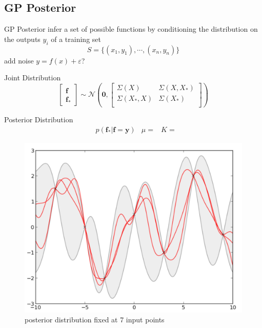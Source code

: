 \documentclass[xcolor=x11names,compress]{beamer}
\begin{document}
    \subsection{GP Posterior}
    \begin{frame}{GP Posterior}
        infer a set of possible functions by conditioning the distribution on the outputs $y_{i}$ of a training set
        \begin{equation*}
            S = \{(x_{1}, y_{1}), \cdots, (x_{n},y_{n})\}
        \end{equation*}
        add noise $y = f(x) + \varepsilon$?
    \end{frame}

\begin{frame}{Joint Distribution}
\begin{equation*}
\begin{bmatrix}\textbf{f}\\\textbf{f}_{*}\end{bmatrix}
\sim \mathcal{N}\left(\textbf{0},
\begin{bmatrix}
    \Sigma(X) & \Sigma(X,X_{*})\\
    \Sigma(X_{*},X) & \Sigma(X_{*})\\
\end{bmatrix}
\right)
\end{equation*}
\end{frame}

\begin{frame}{Posterior Distribution}
\begin{align*}
 & p(\textbf{f}_{*}\vert\textbf{f} =\textbf{y})
 & \mu = 
 & K = 
\end{align*}

\begin{figure}
\centering
\includegraphics[width=.6\textwidth]{../resources/figures/gp_posterior.pdf}
\caption{posterior distribution fixed at 7 input points}
\end{figure}
\end{frame}
\end{document}
